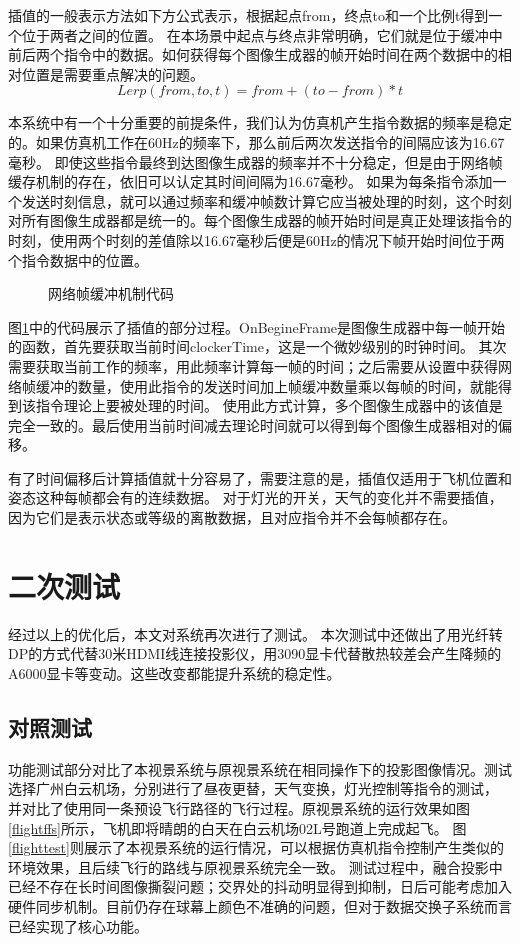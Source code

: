 \par
插值的一般表示方法如下方公式表示，根据起点from，终点to和一个比例t得到一个位于两者之间的位置。
在本场景中起点与终点非常明确，它们就是位于缓冲中前后两个指令中的数据。如何获得每个图像生成器的帧开始时间在两个数据中的相对位置是需要重点解决的问题。
$$Lerp(from,to,t)=from+(to-from)*t$$
\par
本系统中有一个十分重要的前提条件，我们认为仿真机产生指令数据的频率是稳定的。如果仿真机工作在60Hz的频率下，那么前后两次发送指令的间隔应该为16.67毫秒。
即使这些指令最终到达图像生成器的频率并不十分稳定，但是由于网络帧缓存机制的存在，依旧可以认定其时间间隔为16.67毫秒。
如果为每条指令添加一个发送时刻信息，就可以通过频率和缓冲帧数计算它应当被处理的时刻，这个时刻对所有图像生成器都是统一的。每个图像生成器的帧开始时间是真正处理该指令的时刻，使用两个时刻的差值除以16.67毫秒后便是60Hz的情况下帧开始时间位于两个指令数据中的位置。
\begin{figure}[h!]
    \centering
     
    \caption{网络帧缓冲机制代码}
    \label{lerpcode}
\end{figure}
\par
图\ref{lerpcode}中的代码展示了插值的部分过程。OnBegineFrame是图像生成器中每一帧开始的函数，首先要获取当前时间clockerTime，这是一个微妙级别的时钟时间。
其次需要获取当前工作的频率，用此频率计算每一帧的时间；之后需要从设置中获得网络帧缓冲的数量，使用此指令的发送时间加上帧缓冲数量乘以每帧的时间，就能得到该指令理论上要被处理的时间。
使用此方式计算，多个图像生成器中的该值是完全一致的。最后使用当前时间减去理论时间就可以得到每个图像生成器相对的偏移。
\par
有了时间偏移后计算插值就十分容易了，需要注意的是，插值仅适用于飞机位置和姿态这种每帧都会有的连续数据。
对于灯光的开关，天气的变化并不需要插值，因为它们是表示状态或等级的离散数据，且对应指令并不会每帧都存在。

\section{二次测试}
经过以上的优化后，本文对系统再次进行了测试。
本次测试中还做出了用光纤转DP的方式代替30米HDMI线连接投影仪，用3090显卡代替散热较差会产生降频的A6000显卡等变动。这些改变都能提升系统的稳定性。
\subsection{对照测试}
功能测试部分对比了本视景系统与原视景系统在相同操作下的投影图像情况。测试选择广州白云机场，分别进行了昼夜更替，天气变换，灯光控制等指令的测试，
并对比了使用同一条预设飞行路径的飞行过程。原视景系统的运行效果如图\ref{flightffs}所示，飞机即将晴朗的白天在白云机场02L号跑道上完成起飞。
图\ref{flighttest}则展示了本视景系统的运行情况，可以根据仿真机指令控制产生类似的环境效果，且后续飞行的路线与原视景系统完全一致。
测试过程中，融合投影中已经不存在长时间图像撕裂问题；交界处的抖动明显得到抑制，日后可能考虑加入硬件同步机制。目前仍存在球幕上颜色不准确的问题，但对于数据交换子系统而言已经实现了核心功能。

